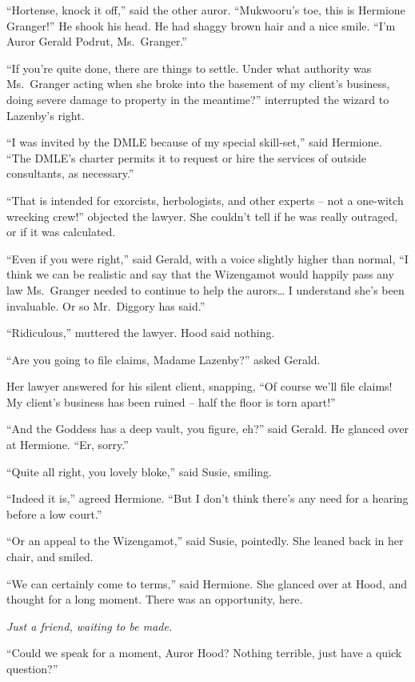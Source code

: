 ``Hortense, knock it off,'' said the other auror. ``Mukwooru's toe, this
is Hermione Granger!'' He shook his head. He had shaggy brown hair and a
nice smile. ``I'm Auror Gerald Podrut, Ms.~Granger.''

``If you're quite done, there are things to settle. Under what authority
was Ms.~Granger acting when she broke into the basement of my client's
business, doing severe damage to property in the meantime?'' interrupted
the wizard to Lazenby's right.

``I was invited by the DMLE because of my special skill-set,'' said
Hermione. ``The DMLE's charter permits it to request or hire the
services of outside consultants, as necessary.''

``That is intended for exorcists, herbologists, and other experts -- not
a one-witch wrecking crew!'' objected the lawyer. She couldn't tell if
he was really outraged, or if it was calculated.

``Even if you were right,'' said Gerald, with a voice slightly higher
than normal, ``I think we can be realistic and say that the Wizengamot
would happily pass any law Ms.~Granger needed to continue to help the
aurors\ldots{} I understand she's been invaluable. Or so Mr.~Diggory has
said.''

``Ridiculous,'' muttered the lawyer. Hood said nothing.

``Are you going to file claims, Madame Lazenby?'' asked Gerald.

Her lawyer answered for his silent client, snapping, ``Of course we'll
file claims! My client's business has been ruined -- half the floor is
torn apart!''

``And the Goddess has a deep vault, you figure, eh?'' said Gerald. He
glanced over at Hermione. ``Er, sorry.''

``Quite all right, you lovely bloke,'' said Susie, smiling.

``Indeed it is,'' agreed Hermione. ``But I don't think there's any need
for a hearing before a low court.''

``Or an appeal to the Wizengamot,'' said Susie, pointedly. She leaned
back in her chair, and smiled.

``We can certainly come to terms,'' said Hermione. She glanced over at
Hood, and thought for a long moment. There was an opportunity, here.

\emph{Just a friend, waiting to be made.}

``Could we speak for a moment, Auror Hood? Nothing terrible, just have a
quick question?''

